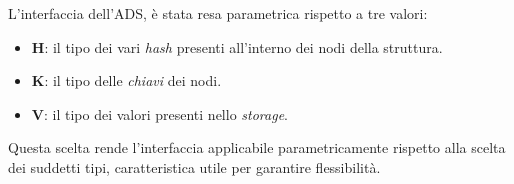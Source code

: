 	
		L'interfaccia dell'ADS, è stata resa parametrica rispetto a tre valori:
		
		\begin{itemize}
			\item \textbf{H}: il tipo dei vari \textit{hash} presenti all'interno dei nodi della struttura.
			\item \textbf{K}: il tipo delle \textit{chiavi} dei nodi.
			\item \textbf{V}: il tipo dei valori presenti nello \textit{storage}. 
		\end{itemize}
	
		Questa scelta rende l'interfaccia applicabile parametricamente rispetto alla scelta dei suddetti tipi, caratteristica utile per garantire flessibilità. 

